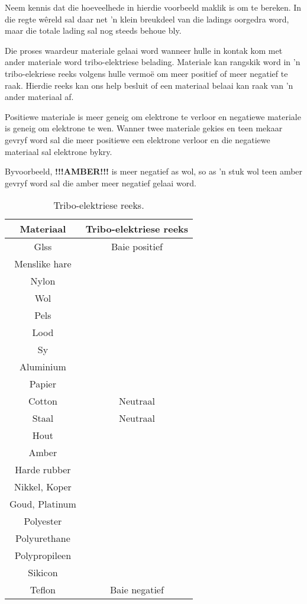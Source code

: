 \begin{minipage}{.35\textwidth}

Neem kennis dat die hoeveelhede in hierdie voorbeeld maklik is om te bereken. In die regte w\^ereld sal daar net 'n klein breukdeel van die ladings oorgedra word, maar die totale lading sal nog steeds behoue bly. \par

Die proses waardeur materiale gelaai word wanneer hulle in kontak kom met ander materiale word tribo-elektriese belading. Materiale kan rangskik word in 'n tribo-elekriese reeks volgens hulle vermo\"e om meer positief of meer negatief te raak. Hierdie reeks kan ons help besluit of een materiaal belaai kan raak van 'n ander materiaal af.

Positiewe materiale is meer geneig om elektrone te verloor en negatiewe materiale is geneig om elektrone te wen. Wanner twee materiale gekies en teen mekaar gevryf word sal die meer positiewe een elektrone verloor en die negatiewe materiaal sal elektrone bykry.

Byvoorbeeld, \textbf{!!!AMBER!!! } is meer negatief as wol, so as 'n stuk wol teen amber gevryf word sal die amber meer negatief gelaai word.
\end{minipage}
\begin{minipage}{.55\textwidth}
\begin{center}
\begin{table}[H]
\centering
\begin{tabular}{|cc|}\hline
\textbf{Materiaal}&\textbf{Tribo-elektriese reeks}\\\hline
Glss& Baie positief\\\hline
Menslike hare&\\\hline
Nylon&\\\hline
Wol&\\\hline
Pels&\\\hline
Lood&\\\hline
Sy&\\\hline
Aluminium&\\\hline
Papier&\\\hline
Cotton&Neutraal\\\hline
Staal &Neutraal\\\hline
Hout&\\\hline
Amber&\\\hline
Harde rubber&\\\hline
Nikkel, Koper&\\\hline
Goud, Platinum&\\\hline
Polyester&\\\hline
Polyurethane&\\\hline
Polypropileen&\\\hline
Sikicon&\\\hline
Teflon& Baie negatief\\\hline
\end{tabular}
\caption{Tribo-elektriese reeks.}
\end{table}
\end{center}
\end{minipage}

